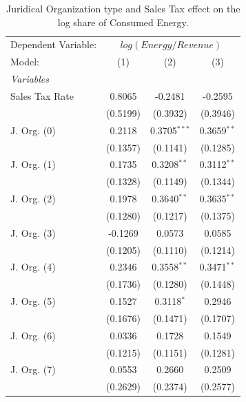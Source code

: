 \documentclass[
  12pt]{article}
\begin{document}
\begin{table}

\caption{\label{tbl-reg-energy}Juridical Organization type and Sales Tax
effect on the log share of Consumed
Energy.}\begin{minipage}[t]{\linewidth}
\subcaption{\label{tbl-reg-energy-1}}

{\centering 

\begingroup
\centering
\begin{tabular}{lccc}
   \tabularnewline \midrule \midrule
   Dependent Variable: & \multicolumn{3}{c}{\(log(Energy/Revenue)\)}\\
   Model:         & (1)      & (2)            & (3)\\  
   \midrule
   \emph{Variables}\\
   Sales Tax Rate & 0.8065   & -0.2481        & -0.2595\\   
                  & (0.5199) & (0.3932)       & (0.3946)\\   
   J. Org. (0)    & 0.2118   & 0.3705$^{***}$ & 0.3659$^{**}$\\   
                  & (0.1357) & (0.1141)       & (0.1285)\\   
   J. Org. (1)    & 0.1735   & 0.3208$^{**}$  & 0.3112$^{**}$\\   
                  & (0.1328) & (0.1149)       & (0.1344)\\   
   J. Org. (2)    & 0.1978   & 0.3640$^{**}$  & 0.3635$^{**}$\\   
                  & (0.1280) & (0.1217)       & (0.1375)\\   
   J. Org. (3)    & -0.1269  & 0.0573         & 0.0585\\   
                  & (0.1205) & (0.1110)       & (0.1214)\\   
   J. Org. (4)    & 0.2346   & 0.3558$^{**}$  & 0.3471$^{**}$\\   
                  & (0.1736) & (0.1280)       & (0.1448)\\   
   J. Org. (5)    & 0.1527   & 0.3118$^{*}$   & 0.2946\\   
                  & (0.1676) & (0.1471)       & (0.1707)\\   
   J. Org. (6)    & 0.0336   & 0.1728         & 0.1549\\   
                  & (0.1215) & (0.1151)       & (0.1281)\\   
   J. Org. (7)    & 0.0553   & 0.2660         & 0.2509\\   
                  & (0.2629) & (0.2374)       & (0.2577)\\   

\end{tabular}}
\end{minipage}
\end{table}
\end{document}
